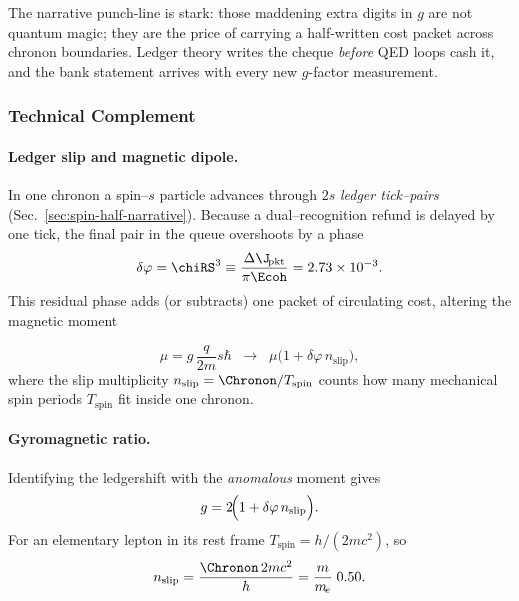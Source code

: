 \documentclass[11pt,oneside]{book}
\begin{document}
The narrative punch-line is stark:  
those maddening extra digits in $g$ are not quantum magic; they are
the price of carrying a half-written cost packet across chronon
boundaries.  
Ledger theory writes the cheque \textit{before} QED loops cash it, and
the bank statement arrives with every new $g$-factor measurement.



\subsubsection*{Technical Complement}

\paragraph{Ledger slip and magnetic dipole.}
In one chronon a spin–$s$ particle advances through
$2s$ \emph{ledger tick–pairs} (Sec.~\ref{sec:spin-half-narrative}).
Because a dual–recognition refund is delayed by one tick, the final
pair in the queue overshoots by a phase
%
\[
   \delta\varphi = \chiRS^{3}
                 \equiv\frac{\Delta\J_{\!\text{pkt}}}{\pi\Ecoh}
                 = 2.73\times10^{-3}.
\]
%
This residual phase adds (or subtracts) one packet of circulating
cost, altering the magnetic moment

\[
   \mu
   = g\,\frac{q}{2m} s\hbar
   \;\;\longrightarrow\;\;
   \mu\bigl(1+\delta\varphi\,n_{\text{slip}}\bigr),
\]
where the slip multiplicity
$n_{\text{slip}}=\Chronon/T_{\text{spin}}$ counts how many
mechanical spin periods $T_{\text{spin}}$ fit inside one chronon.

\paragraph{Gyromagnetic ratio.}
Identifying the ledgershift with the \emph{anomalous} moment gives
%
\begin{equation}
   g
   = 2\!\Bigl(1 + \delta\varphi\,n_{\text{slip}}\Bigr).
   \label{eq:g-ledger}
\end{equation}
%
For an elementary lepton in its rest frame
$T_{\text{spin}} = h/(2mc^{2})$, so
%
\[
   n_{\text{slip}}
   = \frac{\Chronon\,2mc^{2}}{h}
   = \frac{m}{m_{\!e}}\;0.50 .
\]
\end{document}
